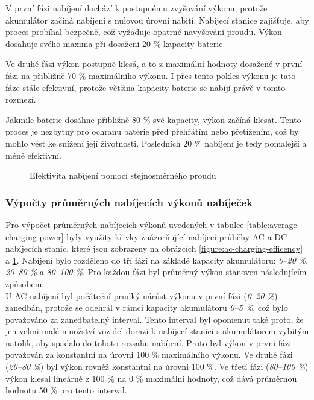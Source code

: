 \documentclass[a4paper,11pt]{article}
\begin{document}
V první fázi nabíjení dochází k postupnému zvyšování výkonu, protože akumulátor začíná nabíjení s nulovou úrovní nabití.
Nabíjecí stanice zajišťuje, aby proces probíhal bezpečně, což vyžaduje opatrné navyšování proudu. Výkon dosahuje svého
maxima při dosažení 20 \% kapacity baterie.

Ve druhé fázi výkon postupně klesá, a to z maximální hodnoty dosažené v první fázi na přibližně 70 \% maximálního výkonu. I přes tento pokles výkonu je tato fáze stále efektivní, protože většina kapacity baterie se nabíjí právě
v tomto rozmezí.

Jakmile baterie dosáhne přibližně 80 \% své kapacity, výkon začíná klesat. Tento proces je nezbytný pro ochranu baterie
před přehřátím nebo přetížením, což by mohlo vést ke snížení její životnosti. Posledních 20 \% nabíjení je tedy
pomalejší a méně efektivní. \cite{ivy_charge}

\begin{figure}[H]
    \centering
    \caption{Efektivita nabíjení pomocí stejnosměrného proudu \cite{evesco_dc_fast_charging}}
    \label{figure:dc-charging-efficency}
\end{figure}


\subsubsection{Výpočty průměrných nabíjecích výkonů nabíječek}
Pro výpočet průměrných nabíjecích výkonů uvedených v tabulce \ref{table:average-charging-power} byly využity křivky znázorňující nabíjecí průběhy AC a DC nabíjecích stanic, které jsou zobrazeny na obrázcích \ref{figure:ac-charging-efficency} a \ref{figure:dc-charging-efficency}. Nabíjení bylo rozděleno do tří fází na základě kapacity akumulátoru: \textit{0–20 \%}, \textit{20–80 \%} a \textit{80–100 \%}. Pro každou fázi byl průměrný výkon stanoven následujícím způsobem.\\

U AC nabíjení byl počáteční prudký nárůst výkonu v první fázi (\textit{0–20 \%}) zanedbán, protože se odehrál v rámci kapacity akumulátoru \textit{0–5 \%}, což bylo považováno za zanedbatelný interval. Tento interval byl opomenut také proto, že jen velmi malé množství vozidel dorazí k nabíjecí stanici s akumulátorem vybitým natolik, aby spadalo do tohoto rozsahu nabíjení. Proto byl výkon v první fázi považován za konstantní na úrovni 100 \% maximálního výkonu. Ve druhé fázi (\textit{20–80 \%}) byl výkon rovněž konstantní na úrovni 100 \%. Ve třetí fázi (\textit{80–100 \%}) výkon klesal lineárně z 100 \% na 0 \% maximální hodnoty, což dává průměrnou hodnotu 50 \% pro tento interval.\\
\end{document}
